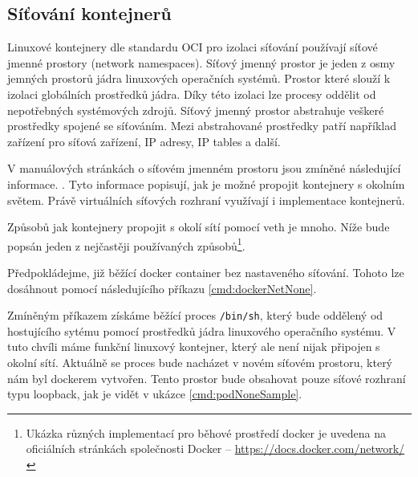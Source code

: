 \subsection{Síťování kontejnerů}
Linuxové kontejnery dle standardu OCI pro izolaci síťování používají síťové jmenné prostory (network namespaces).
Síťový jmenný prostor je jeden z osmy jemných prostorů jádra linuxových operačních systémů. Prostor které slouží k izolaci globálních prostředků jádra. Díky této izolaci lze procesy oddělit od nepotřebných systémových zdrojů. Síťový jmenný prostor abstrahuje veškeré prostředky spojené se síťováním. Mezi abstrahované prostředky patří například zařízení pro síťová zařízení, IP adresy, IP tables a další.\cite{thelinuxmanpagesproject_2022_namespaces7}\cite{thelinuxmanpagesproject_2022_network_namespaces7}

V manuálových stránkách o síťovém jmenném prostoru jsou zmíněné následující informace.  .\cite{thelinuxmanpagesproject_2022_network_namespaces7} Tyto informace popisují, jak je možné propojit kontejnery s okolním světem. Právě virtuálních síťových rozhraní využívají i implementace kontejnerů.    

Způsobů jak kontejnery propojit s okolí sítí pomocí veth je mnoho. Níže bude popsán jeden z nejčastěji používaných způsobů\footnote{Ukázka různých implementací pro běhové prostředí docker je uvedena na oficiálních stránkách společnosti Docker -- \url{https://docs.docker.com/network/}}.

Předpokládejme, již běžící docker container bez nastaveného síťování. Tohoto lze dosáhnout pomocí následujícího příkazu \ref{cmd:dockerNetNone}.


Zmíněným příkazem získáme běžící proces \verb|/bin/sh|, který bude oddělený od hostujícího sytému pomocí prostředků jádra linuxového operačního systému. V tuto chvíli máme funkční linuxový kontejner, který ale není nijak připojen s okolní sítí. Aktuálně se proces bude nacházet v novém síťovém prostoru, který nám byl dockerem vytvořen. Tento prostor bude obsahovat pouze síťové rozhraní typu loopback, jak je vidět v ukázce \ref{cmd:podNoneSample}. 



